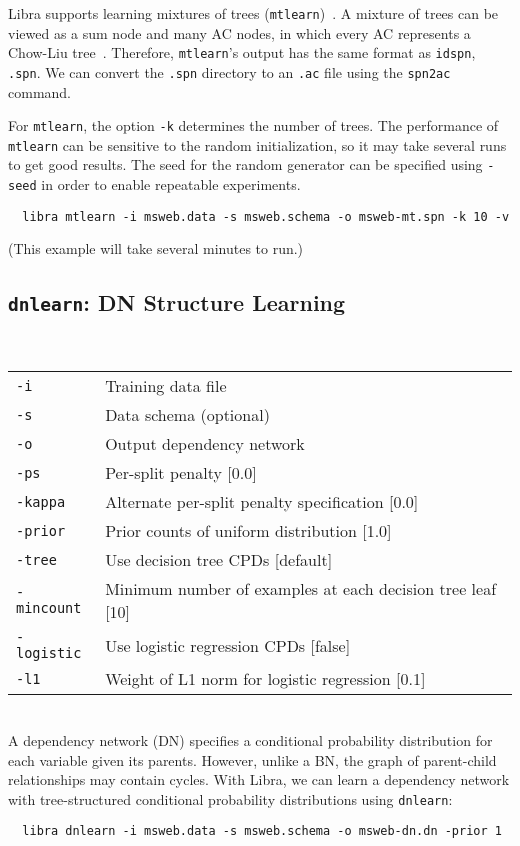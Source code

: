 \documentclass[11pt]{article}
\begin{document}
Libra supports learning mixtures of trees
({\tt mtlearn})~\cite{meila&jordan00}. A mixture of trees can be viewed as a
sum node and many AC nodes, in which every AC represents a Chow-Liu
tree~\cite{chow&liu68}. Therefore, {\tt mtlearn}'s output has the same
format as {\tt idspn}, {\tt .spn}. We can convert the {\tt .spn}
directory to an {\tt .ac} file using the {\tt spn2ac} command.

For {\tt mtlearn}, the option {\tt -k} determines the number of trees.
The performance of {\tt mtlearn} can be sensitive to the
random initialization, so it may take several runs to get good
results.  The seed for the random generator can be specified using
{\tt -seed} in order to enable repeatable experiments.
\begin{verbatim}
  libra mtlearn -i msweb.data -s msweb.schema -o msweb-mt.spn -k 10 -v
\end{verbatim}
(This example will take several minutes to run.)

\subsection{{\tt dnlearn}: DN Structure Learning} \label{sec:dnlearn}

\noindent {} \\
\begin{tabular}{ll}
{\tt -i} &         Training data file \\
{\tt -s} &         Data schema (optional) \\
{\tt -o} &         Output dependency network \\
{\tt -ps} &        Per-split penalty [0.0] \\
{\tt -kappa} &     Alternate per-split penalty specification [0.0] \\
{\tt -prior} &     Prior counts of uniform distribution [1.0] \\
{\tt -tree} &      Use decision tree CPDs [default] \\
{\tt -mincount} &  Minimum number of examples at each decision tree leaf [10] \\
{\tt -logistic} &  Use logistic regression CPDs [false] \\
{\tt -l1} &        Weight of L1 norm for logistic regression [0.1] \\
\end{tabular} \\

A dependency network (DN) specifies a conditional probability
distribution for each variable given its parents.  However, unlike a
BN, the graph of parent-child relationships may contain cycles.  With
Libra, we can learn a dependency network with tree-structured
conditional probability distributions using {\tt dnlearn}:
\begin{verbatim}
  libra dnlearn -i msweb.data -s msweb.schema -o msweb-dn.dn -prior 1
\end{verbatim}
\end{document}
